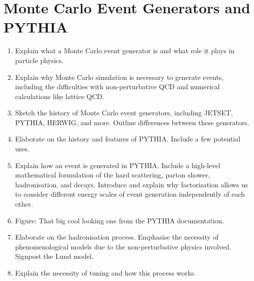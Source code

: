 \documentclass[12pt,a4paper]{report}
\begin{document}
\section{Monte Carlo Event Generators and PYTHIA}
\begin{enumerate}
\item Explain what a Monte Carlo event generator is and what role it plays in particle physics.
\item Explain why Monte Carlo simulation is necessary to generate events, including the difficulties with non-perturbative QCD and numerical calculations like lattice QCD.
\item Sketch the history of Monte Carlo event generators, including JETSET, PYTHIA, HERWIG, and more. Outline differences between these generators.
\item Elaborate on the history and features of PYTHIA. Include a few potential uses.
\item Explain how an event is generated in PYTHIA. Include a high-level mathematical formulation of the hard scattering, parton shower, hadronisation, and decays. Introduce and explain why factorisation allows us to consider different energy scales of event generation independently of each other.
\item Figure: That big cool looking one from the PYTHIA documentation.
\item Elaborate on the hadronisation process. Emphasise the necessity of phenomenological models due to the non-perturbative physics involved. Signpost the Lund model.
\item Explain the necessity of tuning and how this process works.
\end{enumerate}
\end{document}
